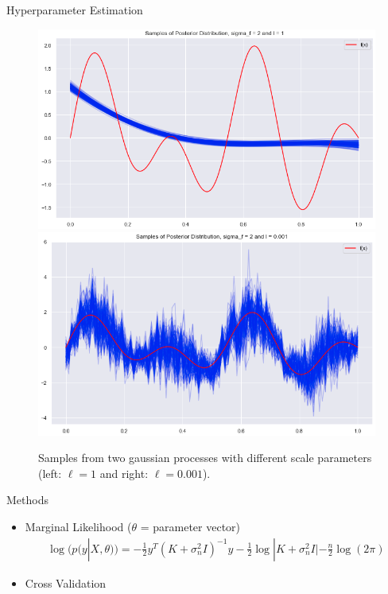 \documentclass[10pt]{beamer}
\begin{document}
\begin{frame}{Hyperparameter Estimation}{\cite[Chapter 2.3, 5]{RW05}}
\begin{center}
\begin{figure}
\includegraphics[scale=0.21]{images/hyp_posterior_1_example2}
\includegraphics[scale=0.21]{images/hyp_posterior_2_example2}
\caption{Samples from two gaussian processes with different scale parameters (left: $\ell=1$ and right: $\ell = 0.001$).}
\end{figure}
\end{center}
\begin{block}{Methods}
\begin{itemize}
\item Marginal Likelihood ($\theta$ = parameter vector)
\begin{align*}
\log(p(y|X, \theta)) = -\frac{1}{2}y^T (K+\sigma_n^2I)^{-1}y - \frac{1}{2}\log|K+\sigma_n^2I| - \frac{n}{2}\log (2\pi)
\end{align*}
\item Cross Validation
\end{itemize}
\end{block}
\end{frame}
\end{document}
